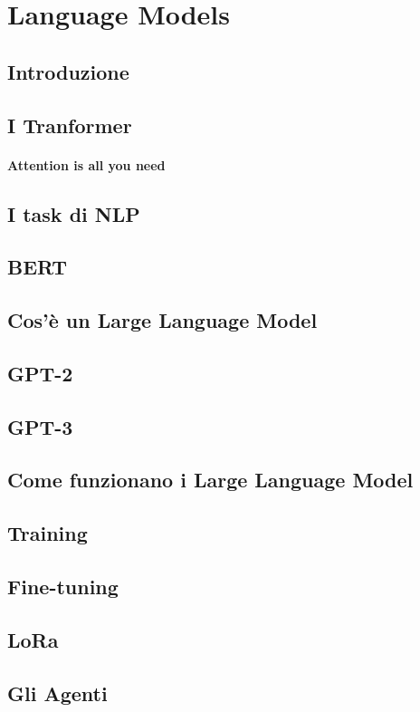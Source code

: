 \chapter{Language Models}
\label{Language_Models}
\section{Introduzione}
\section{I Tranformer}
\subsubsection[Attention is all you need]{Attention is all you need}
\section{I task di NLP}
\section{BERT}
\section{Cos'è un Large Language Model}
\section{GPT-2}
\section{GPT-3}
\section{Come funzionano i Large Language Model}
\section{Training}
\section{Fine-tuning}
\section{LoRa}
\section{Gli Agenti}